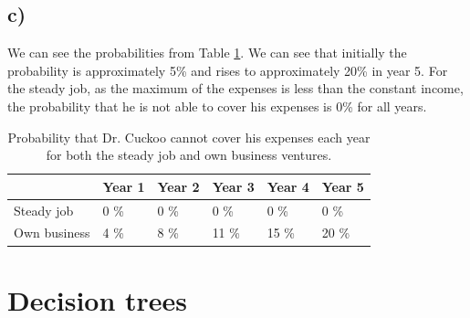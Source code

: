 \documentclass{article}
\begin{document}
\subsection{c)}
	We can see the probabilities from Table \ref{tab:1c}. We can see that initially the probability is approximately 5\% and rises to approximately 20\% in year 5. For the steady job, as the maximum of the expenses is less than the constant income, the probability that he is not able to cover his expenses is 0\% for all years.
	\begin{table}[h]
		\centering
		\caption{Probability that Dr. Cuckoo cannot cover his expenses each year for both the steady job and own business ventures.}
		\label{tab:1c}
		\begin{tabular}{l|l|l|l|l|l|}
			\cline{2-6}
			& Year 1 & Year 2 & Year 3 & Year 4 & Year 5 \\ \hline
			\multicolumn{1}{|l|}{Steady job}   & 0 \%   & 0 \%   & 0 \%   & 0 \%   & 0 \%   \\ \hline
			\multicolumn{1}{|l|}{Own business} & 4 \%   & 8 \%   & 11 \%  & 15 \%  & 20 \%  \\ \hline
		\end{tabular}
	\end{table}
\section{Decision trees}
\end{document}
